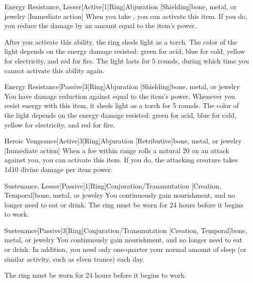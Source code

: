             \begin{magicitemdef}{Energy Resistance, Lesser}[Active]{1}[Ring]{Abjuration [Shielding]}{bone, metal, or jewelry}
                [Immediate action] When you take , you can activate this item. If you do, you reduce the damage by an amount equal to the item's power.

                After you activate this ability, the ring sheds light as a torch.
                The color of the light depends on the energy damage resisted: green for acid, blue for cold, yellow for electricity, and red for fire.
                The light lasts for 5 rounds, during which time you cannot activate this ability again.
            \end{magicitemdef}

            \begin{magicitemdef}{Energy Resistance}[Passive]{3}[Ring]{Abjuration [Shielding]}{bone, metal, or jewelry}
                 You have damage reduction against  equal to the item's power.
                Whenever you resist energy with this item, it sheds light as a torch for 5 rounds.
                The color of the light depends on the energy damage resisted: green for acid, blue for cold, yellow for electricity, and red for fire.
            \end{magicitemdef}

            \begin{magicitemdef}{Heroic Vengeance}[Active]{3}[Ring]{Abjuration [Retributive]}{bone, metal, or jewelry}
                [Immediate action] When a foe within \rngmed range rolls a natural 20 on an attack against you, you can activate this item. If you do, the attacking creature takes 1d10 divine damage per item power.
            \end{magicitemdef}

            \begin{magicitemdef}{Sustenance, Lesser}[Passive]{1}[Ring]{Conjuration/Transmutation [Creation, Temporal]}{bone, metal, or jewelry}
                 You continuously gain nourishment, and no longer need to eat or drink.
                The ring must be worn for 24 hours before it begins to work.
            \end{magicitemdef}

            \begin{magicitemdef}{Sustenance}[Passive]{3}[Ring]{Conjuration/Transmutation [Creation, Temporal]}{bone, metal, or jewelry}
                 You continuously gain nourishment, and no longer need to eat or drink.
                In addition, you need only one-quarter your normal amount of sleep (or similar activity, such as elven trance) each day.

                The ring must be worn for 24 hours before it begins to work.
            \end{magicitemdef}

